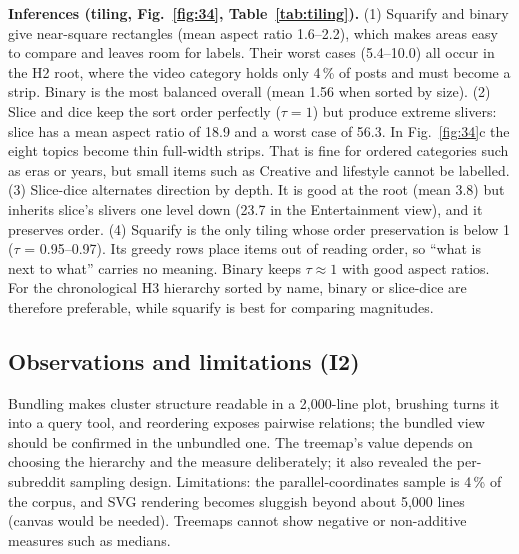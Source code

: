 \textbf{Inferences (tiling, Fig.~\ref{fig:34}, Table~\ref{tab:tiling}).}
(1) Squarify and binary give near-square rectangles (mean aspect ratio 1.6--2.2), which makes areas easy to compare and
leaves room for labels. Their worst cases (5.4--10.0) all occur in the H2 root, where the video category holds only
4\,\% of posts and must become a strip. Binary is the most balanced overall (mean 1.56 when sorted by size).
(2) Slice and dice keep the sort order perfectly ($\tau=1$) but produce extreme slivers: slice has a mean aspect ratio of
18.9 and a worst case of 56.3. In Fig.~\ref{fig:34}c the eight topics
become thin full-width strips. That is fine for ordered categories such as eras or years, but small items such as
Creative and lifestyle cannot be labelled.
(3) Slice-dice alternates direction by depth. It is good at the root (mean 3.8) but inherits slice's slivers one level
down (23.7 in the Entertainment view), and it preserves order.
(4) Squarify is the only tiling whose order preservation is below 1 ($\tau$ = 0.95--0.97). Its greedy rows place items out
of reading order, so ``what is next to what'' carries no meaning. Binary keeps $\tau\approx1$ with good aspect ratios.
For the chronological H3 hierarchy sorted by name, binary or slice-dice are therefore preferable, while squarify is best
for comparing magnitudes.

\subsection{Observations and limitations (I2)}
Bundling makes cluster structure readable in a 2,000-line plot, brushing turns it into a query tool, and reordering exposes
pairwise relations; the bundled view should be confirmed in the unbundled one. The treemap's value depends on choosing the
hierarchy and the measure deliberately; it also revealed the per-subreddit sampling design. Limitations: the
parallel-coordinates sample is 4\,\% of the corpus, and SVG rendering becomes sluggish beyond about 5,000 lines (canvas
would be needed). Treemaps cannot show negative or non-additive measures such as medians.
